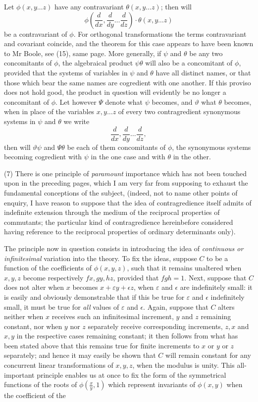 \documentclass[11pt]{article}
\newcommand{\sourcepage}[1]{\marginpar{\scriptsize p.~#1}}
\begin{document}
{{\sourcepage{326}
Let $\phi(x,y\ldots z)$ have any contravariant $\theta(x,y\ldots z)$; then will
\[
\phi\left(\frac{d}{dx},\frac{d}{dy}\ldots\frac{d}{dz}\right)\cdot\theta(x,y\ldots z)
\]
be a contravariant of $\phi$. For orthogonal transformations the terms contravariant and covariant coincide, and the theorem for this case appears to have been known to Mr Boole, see (15), same page. More generally, if $\psi$ and $\theta$ be any two concomitants of $\phi$, the algebraical product $\psi\theta$ will also be a concomitant of $\phi$, provided that the systems of variables in $\psi$ and $\theta$ have all distinct names, or that those which bear the same names are cogredient with one another. If this proviso does not hold good, the product in question will evidently be no longer a concomitant of $\phi$. Let however $\Psi$ denote what $\psi$ becomes, and $\vartheta$ what $\theta$ becomes, when in place of the variables $x,y\ldots z$ of every two contragredient synonymous systems in $\psi$ and $\theta$ we write
\[
\frac{d}{dx},\frac{d}{dy}\ldots\frac{d}{dz},
\]
then will $\vartheta\psi$ and $\Psi\theta$ be each of them concomitants of $\phi$, the synonymous systems becoming cogredient with $\psi$ in the one case and with $\theta$ in the other.

(7) There is one principle of \emph{paramount} importance which has not been touched upon in the preceding pages, which I am very far from supposing to exhaust the fundamental conceptions of the subject, (indeed, not to name other points of enquiry, I have reason to suppose that the idea of contragredience itself admits of indefinite extension through the medium of the reciprocal properties of commutants; the particular kind of contragredience hereinbefore considered having reference to the reciprocal properties of ordinary determinants only).

The principle now in question consists in introducing the idea of \emph{continuous or infinitesimal} variation into the theory. To fix the ideas, suppose $C$ to be a function of the coefficients of $\phi(x,y,z)$, such that it remains unaltered when $x,y,z$ become respectively $fx,gy,hz$, provided that $fgh=1$. Next, suppose that $C$ does not alter when $x$ becomes $x+\varepsilon y+\epsilon z$, when $\varepsilon$ and $\epsilon$ are indefinitely small: it is easily and obviously demonstrable that if this be true for $\varepsilon$ and $\epsilon$ indefinitely small, it must be true for \emph{all} values of $\varepsilon$ and $\epsilon$. Again, suppose that $C$ alters neither when $x$ receives such an infinitesimal increment, $y$ and $z$ remaining constant, nor when $y$ nor $z$ separately receive corresponding increments, $z,x$ and $x,y$ in the respective cases remaining constant; it then follows from what has been stated above that this remains true for finite increments to $x$ or $y$ or $z$ separately; and hence it may easily be shown that $C$ will remain constant for any concurrent linear transformations of $x,y,z$, when the modulus is unity. This all-important principle enables us at once to fix the form of the symmetrical functions of the roots of $\phi\left(\frac{x}{y},1\right)$ which represent invariants of $\phi(x,y)$ when the coefficient of the

}}
\end{document}

